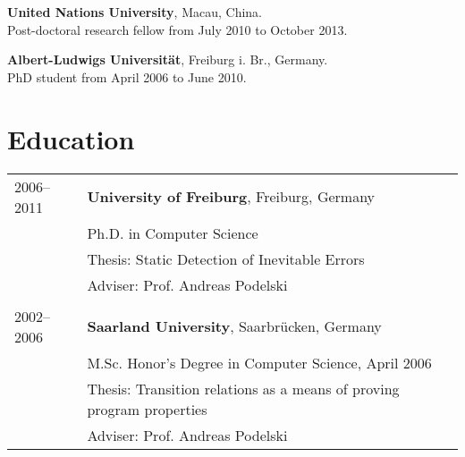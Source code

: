 \documentclass[margin,line]{res}
\begin{document}
\begin{resume}
\textbf{United Nations University}, Macau, China.\\
Post-doctoral research fellow from July 2010 to October 2013.

\textbf{Albert-Ludwigs Universit\"at}, Freiburg i. Br., Germany.\\
PhD student from April 2006 to June 2010.

\bigskip
\section{\sc Education}

\begin{tabular}{@{}ll@{}}
2006--2011 & {\bf University of Freiburg}, Freiburg, Germany\\
& Ph.D. in Computer Science\\
& Thesis: Static Detection of Inevitable Errors\\
& Adviser: Prof. Andreas Podelski \\
\\
2002--2006 & {\bf Saarland University}, Saarbr\" ucken, Germany\\
& M.Sc. Honor's Degree in Computer Science, April 2006\\
& Thesis: Transition relations as a means of proving program properties\\
& Adviser: Prof. Andreas Podelski
\end{tabular}

\newpage

\bigskip

\bigskip

\bigskip
\newpage

\bigskip

\bigskip
%



\iffalse

\end{resume}
\end{document}
